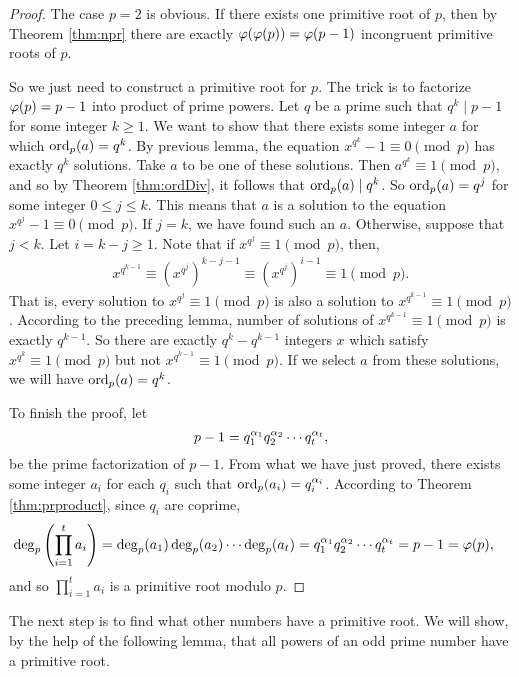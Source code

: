 \documentclass{subfile}
\begin{document}
	\begin{proof}
		The case $p=2$ is obvious. If there exists one primitive root of $p$, then by Theorem \ref{thm:npr} there are exactly $\varphi(\varphi(p))=\varphi(p-1)$ incongruent primitive roots of $p$.
		
		So we just need to construct a primitive root for $p$. The trick is to factorize $\varphi(p)=p-1$ into product of prime powers. Let $q$ be a prime such that $q^k \mid p-1$ for some integer $k \geq 1$. We want to show that there exists some integer $a$ for which $\operatorname{ord}_p(a)=q^k$. By previous lemma, the equation $x^{q^k} - 1 \equiv 0 \pmod p$ has exactly $q^k$ solutions. Take $a$ to be one of these solutions. Then $a^{q^k} \equiv 1 \pmod p$, and so by Theorem \ref{thm:ordDiv}, it follows that $\operatorname{ord}_p(a)\mid q^k$. So $\operatorname{ord}_p(a)=q^j$ for some integer $0 \leq j \leq k$. This means that $a$ is a solution to the equation $x^{q^j} - 1 \equiv 0 \pmod p$. If $j=k$, we have found such an $a$. Otherwise, suppose that $j<k$. Let $i=k-j\geq 1$. Note that if $x^{q^j} \equiv 1 \pmod p$, then,
			\begin{align*}
				x^{q^{k-1}} \equiv \left(x^{q^j}\right)^{k-j-1} \equiv \left(x^{q^j}\right)^{i-1} \equiv 1 \pmod p.
			\end{align*}
		That is, every solution to $x^{q^j} \equiv 1 \pmod p$ is also a solution to $x^{q^{k-1}} \equiv 1 \pmod p$. According to the preceding lemma, number of solutions of $x^{q^{k-1}} \equiv 1 \pmod p$ is exactly $q^{k-1}$. So there are exactly $q^k - q^{k-1}$ integers $x$ which satisfy $x^{q^k} \equiv 1 \pmod p$ but not $x^{q^{k-1}} \equiv 1 \pmod p$. If we select $a$ from these solutions, we will have $\operatorname{ord}_p(a)=q^k$.
		
		To finish the proof, let $$p-1 = q_1^{\alpha_1}q_2^{\alpha_2} \cdots q_t^{\alpha_t},$$ be the prime factorization of $p-1$. From what we have just proved, there exists some integer $a_i$ for each $q_i$ such that $\operatorname{ord}_p(a_i)=q_i^{\alpha_i}$. According to Theorem \eqref{thm:prproduct}, since $q_i$ are coprime, 
			\begin{align*}
				\deg_p\left(\prod_{i=1}^{t}a_i\right)&=\deg_p(a_1) \deg_p(a_2) \cdots \deg_p(a_t)=q_1^{\alpha_1}q_2^{\alpha_2} \cdots q_t^{\alpha_t} = p-1 =\varphi(p),
			\end{align*}
		and so $\prod_{i=1}^{t}a_i$ is a primitive root modulo $p$.
	\end{proof}
	
The next step is to find what other numbers have a primitive root. We will show, by the help of the following lemma, that all powers of an odd prime number have a primitive root.
	
\end{document}

